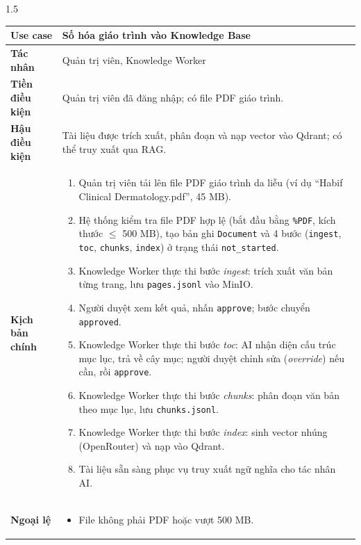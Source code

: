 \begin{spacing}{1.5}
\renewcommand{\arraystretch}{1.15}
\begin{longtable}{|>{\raggedright\arraybackslash}p{}|>{\raggedright\arraybackslash}p{}|}
\hline
\textbf{Use case} & Số hóa giáo trình vào Knowledge Base \\ \hline
\textbf{Tác nhân} & Quản trị viên, Knowledge Worker \\ \hline
\textbf{Tiền điều kiện} & Quản trị viên đã đăng nhập; có file PDF giáo trình. \\ \hline
\textbf{Hậu điều kiện} & Tài liệu được trích xuất, phân đoạn và nạp vector vào Qdrant; có thể truy xuất qua RAG. \\ \hline
\textbf{Kịch bản chính} &
\begin{enumerate}[nosep,leftmargin=*]
  \item Quản trị viên tải lên file PDF giáo trình da liễu (ví dụ ``Habif Clinical Dermatology.pdf'', 45 MB).
  \item Hệ thống kiểm tra file PDF hợp lệ (bắt đầu bằng \texttt{\%PDF}, kích thước $\le$ 500 MB), tạo bản ghi \texttt{Document} và 4 bước (\texttt{ingest}, \texttt{toc}, \texttt{chunks}, \texttt{index}) ở trạng thái \texttt{not\_started}.
  \item Knowledge Worker thực thi bước \textit{ingest}: trích xuất văn bản từng trang, lưu \texttt{pages.jsonl} vào MinIO.
  \item Người duyệt xem kết quả, nhấn \texttt{approve}; bước chuyển \texttt{approved}.
  \item Knowledge Worker thực thi bước \textit{toc}: AI nhận diện cấu trúc mục lục, trả về cây mục; người duyệt chỉnh sửa (\textit{override}) nếu cần, rồi \texttt{approve}.
  \item Knowledge Worker thực thi bước \textit{chunks}: phân đoạn văn bản theo mục lục, lưu \texttt{chunks.jsonl}.
  \item Knowledge Worker thực thi bước \textit{index}: sinh vector nhúng (OpenRouter) và nạp vào Qdrant.
  \item Tài liệu sẵn sàng phục vụ truy xuất ngữ nghĩa cho tác nhân AI.
\end{enumerate} \\ \hline
\textbf{Ngoại lệ} &
\begin{itemize}[nosep,leftmargin=2.6em,labelwidth=2em,labelsep=0.5em,align=left]
  \item[2.] File không phải PDF hoặc vượt 500 MB.
  \begin{itemize}[nosep,leftmargin=3em,labelwidth=2.4em,labelsep=0.4em,align=left]

\end{itemize}
\end{itemize}
\end{longtable}
\end{spacing}

